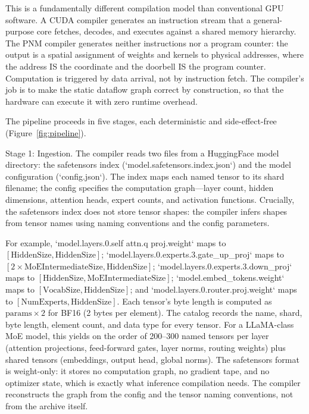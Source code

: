 \documentclass[10pt,twocolumn]{article}
\begin{document}
This is a fundamentally different compilation model than conventional GPU software. A CUDA compiler generates an instruction stream that a general-purpose core fetches, decodes, and executes against a shared memory hierarchy. The PNM compiler generates neither instructions nor a program counter: the output is a spatial assignment of weights and kernels to physical addresses, where the address IS the coordinate and the doorbell IS the program counter. Computation is triggered by data arrival, not by instruction fetch. The compiler's job is to make the static dataflow graph correct by construction, so that the hardware can execute it with zero runtime overhead.

The pipeline proceeds in five stages, each deterministic and side-effect-free (Figure~\ref{fig:pipeline}).

Stage 1: Ingestion. The compiler reads two files from a HuggingFace model directory: the safetensors index (`model.safetensors.index.json`) and the model configuration (`config.json`). The index maps each named tensor to its shard filename; the config specifies the computation graph---layer count, hidden dimensions, attention heads, expert counts, and activation functions. Crucially, the safetensors index does not store tensor shapes: the compiler infers shapes from tensor names using naming conventions and the config parameters.

For example, `model.layers.0.self attn.q proj.weight` maps to $[\mathrm{HiddenSize}, \mathrm{HiddenSize}]$; `model.layers.0.experts.3.gate\_up\_proj` maps to $[2 \times \mathrm{MoEIntermediateSize}, \mathrm{HiddenSize}]$; `model.layers.0.experts.3.down\_proj` maps to $[\mathrm{HiddenSize}, \mathrm{MoEIntermediateSize}]$; `model.embed\_tokens.weight` maps to $[\mathrm{VocabSize}, \mathrm{HiddenSize}]$; and `model.layers.0.router.proj.weight` maps to $[\mathrm{NumExperts}, \mathrm{HiddenSize}]$. Each tensor's byte length is computed as $\mathrm{params} \times 2$ for BF16 (2 bytes per element). The catalog records the name, shard, byte length, element count, and data type for every tensor. For a LLaMA-class MoE model, this yields on the order of 200--300 named tensors per layer (attention projections, feed-forward gates, layer norms, routing weights) plus shared tensors (embeddings, output head, global norms). The safetensors format is weight-only: it stores no computation graph, no gradient tape, and no optimizer state, which is exactly what inference compilation needs. The compiler reconstructs the graph from the config and the tensor naming conventions, not from the archive itself.
\end{document}
